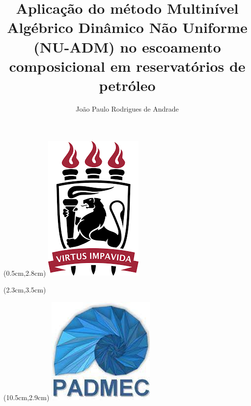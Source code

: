 \documentclass[professionalfont]{beamer}
\title[NU-ADM]{Aplicação do método Multinível Algébrico Dinâmico Não Uniforme (NU-ADM) no escoamento composicional em reservatórios de petróleo}
\author[João Paulo Rodrigues de Andrade]{João Paulo Rodrigues de Andrade}
\institute[UFPE]{Universidade Federal de Pernambuco}
\date{}
\begin{document}

\begin{frame}
    \begin{minipage}{\textwidth}
    
    \begin{textblock*}{5cm}(0.5cm,2.8cm) %
        \includegraphics[scale=0.2]{./imgs/ufpe.png}
    \end{textblock*}
    
    \begin{textblock*}{8cm}(2.3cm,3.5cm) %
        \Large \instituicao
    \end{textblock*}
    
    \begin{textblock*}{5cm}(10.5cm,2.9cm) %
        \includegraphics[scale=0.25]{./imgs/padmec.jpeg}
    \end{textblock*}
    \end{minipage}
    
    \vspace{1.8cm}
    

\end{frame}
\end{document}
